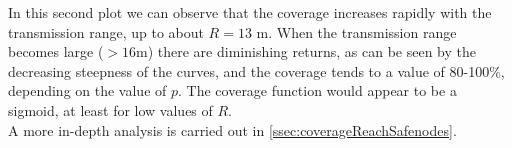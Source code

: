 In this second plot we can observe that the coverage increases rapidly
with the transmission range, up to about $R=13$ m. When the transmission range becomes large
($> 16$m) there are diminishing returns, as can be seen by the decreasing steepness of the curves, and the coverage tends to a value of 80-100\%, depending on the value of $p$. The coverage function would appear to be a sigmoid, at least for low values of $R$.\\
A more in-depth analysis is carried out in \ref{ssec:coverageReachSafenodes}.
\newpage
